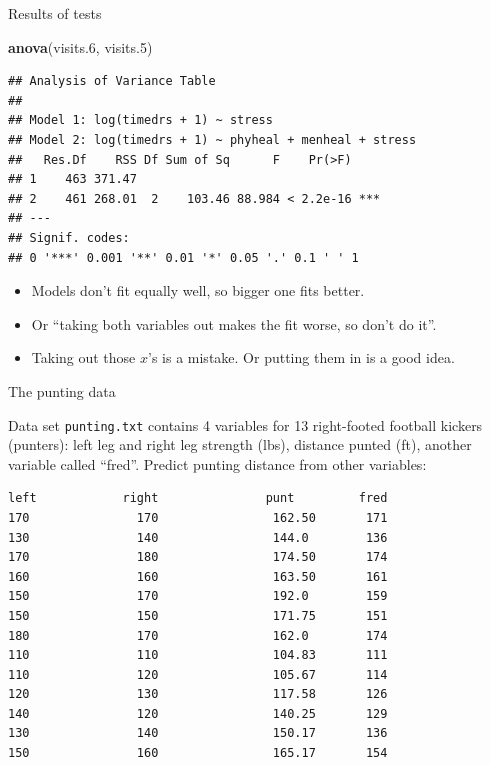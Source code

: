 \documentclass[ignorenonframetext,]{beamer}
\newenvironment{Shaded}{\begin{snugshade}}{\end{snugshade}}
\newcommand{\FloatTok}[1]{\textcolor[rgb]{0.00,0.00,0.81}{#1}}
\newcommand{\KeywordTok}[1]{\textcolor[rgb]{0.13,0.29,0.53}{\textbf{#1}}}
\newcommand{\NormalTok}[1]{#1}
\begin{document}
\begin{frame}[fragile]{Results of tests}
\protect\hypertarget{results-of-tests}{}

\begin{Shaded}
\begin{Highlighting}[]
\KeywordTok{anova}\NormalTok{(visits}\FloatTok{.6}\NormalTok{, visits}\FloatTok{.5}\NormalTok{)}
\end{Highlighting}
\end{Shaded}

\begin{verbatim}
## Analysis of Variance Table
## 
## Model 1: log(timedrs + 1) ~ stress
## Model 2: log(timedrs + 1) ~ phyheal + menheal + stress
##   Res.Df    RSS Df Sum of Sq      F    Pr(>F)    
## 1    463 371.47                                  
## 2    461 268.01  2    103.46 88.984 < 2.2e-16 ***
## ---
## Signif. codes:  
## 0 '***' 0.001 '**' 0.01 '*' 0.05 '.' 0.1 ' ' 1
\end{verbatim}

\begin{itemize}
\item
  Models don't fit equally well, so bigger one fits better.
\item
  Or ``taking both variables out makes the fit worse, so don't do it''.
\item
  Taking out those \(x\)'s is a mistake. Or putting them in is a good
  idea.
\end{itemize}

\end{frame}

\begin{frame}[fragile]{The punting data}
\protect\hypertarget{the-punting-data}{}

Data set \texttt{punting.txt} contains 4 variables for 13 right-footed
football kickers (punters): left leg and right leg strength (lbs),
distance punted (ft), another variable called ``fred''. Predict punting
distance from other variables:

\scriptsize

\begin{verbatim}
left            right               punt         fred
170               170                162.50       171 
130               140                144.0        136   
170               180                174.50       174 
160               160                163.50       161 
150               170                192.0        159 
150               150                171.75       151 
180               170                162.0        174 
110               110                104.83       111 
110               120                105.67       114 
120               130                117.58       126 
140               120                140.25       129  
130               140                150.17       136 
150               160                165.17       154 
\end{verbatim}

\normalsize

\end{frame}
\end{document}
